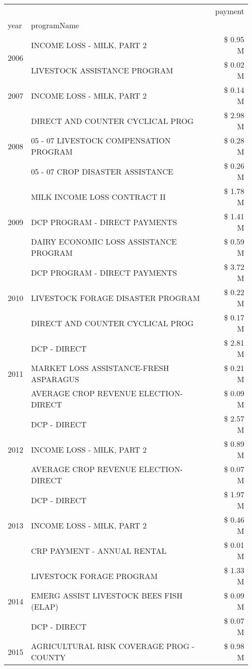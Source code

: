 \begin{tabular}{llr}
\toprule
 &  & payment \\
year & programName &  \\
\midrule
\multirow[t]{2}{*}{2006} & INCOME LOSS - MILK, PART 2 & \$ 0.95 M \\
 & LIVESTOCK ASSISTANCE PROGRAM & \$ 0.02 M \\
\cline{1-3}
2007 & INCOME LOSS - MILK, PART 2 & \$ 0.14 M \\
\cline{1-3}
\multirow[t]{3}{*}{2008} & DIRECT AND COUNTER CYCLICAL PROG & \$ 2.98 M \\
 & 05 - 07 LIVESTOCK COMPENSATION PROGRAM & \$ 0.28 M \\
 & 05 - 07 CROP DISASTER ASSISTANCE & \$ 0.26 M \\
\cline{1-3}
\multirow[t]{3}{*}{2009} & MILK INCOME LOSS CONTRACT II & \$ 1.78 M \\
 & DCP PROGRAM - DIRECT PAYMENTS & \$ 1.41 M \\
 & DAIRY ECONOMIC LOSS ASSISTANCE PROGRAM & \$ 0.59 M \\
\cline{1-3}
\multirow[t]{3}{*}{2010} & DCP PROGRAM - DIRECT PAYMENTS & \$ 3.72 M \\
 & LIVESTOCK FORAGE DISASTER  PROGRAM & \$ 0.22 M \\
 & DIRECT AND COUNTER CYCLICAL PROG & \$ 0.17 M \\
\cline{1-3}
\multirow[t]{3}{*}{2011} & DCP - DIRECT & \$ 2.81 M \\
 & MARKET LOSS ASSISTANCE-FRESH ASPARAGUS & \$ 0.21 M \\
 & AVERAGE CROP REVENUE ELECTION-DIRECT & \$ 0.09 M \\
\cline{1-3}
\multirow[t]{3}{*}{2012} & DCP - DIRECT & \$ 2.57 M \\
 & INCOME LOSS - MILK, PART 2 & \$ 0.89 M \\
 & AVERAGE CROP REVENUE ELECTION-DIRECT & \$ 0.07 M \\
\cline{1-3}
\multirow[t]{3}{*}{2013} & DCP - DIRECT & \$ 1.97 M \\
 & INCOME LOSS - MILK, PART 2 & \$ 0.46 M \\
 & CRP PAYMENT - ANNUAL RENTAL & \$ 0.01 M \\
\cline{1-3}
\multirow[t]{3}{*}{2014} & LIVESTOCK FORAGE PROGRAM & \$ 1.33 M \\
 & EMERG ASSIST LIVESTOCK BEES FISH (ELAP) & \$ 0.09 M \\
 & DCP - DIRECT & \$ 0.07 M \\
\cline{1-3}
\multirow[t]{3}{*}{2015} & AGRICULTURAL RISK COVERAGE PROG - COUNTY & \$ 0.98 M \\

\end{tabular}
